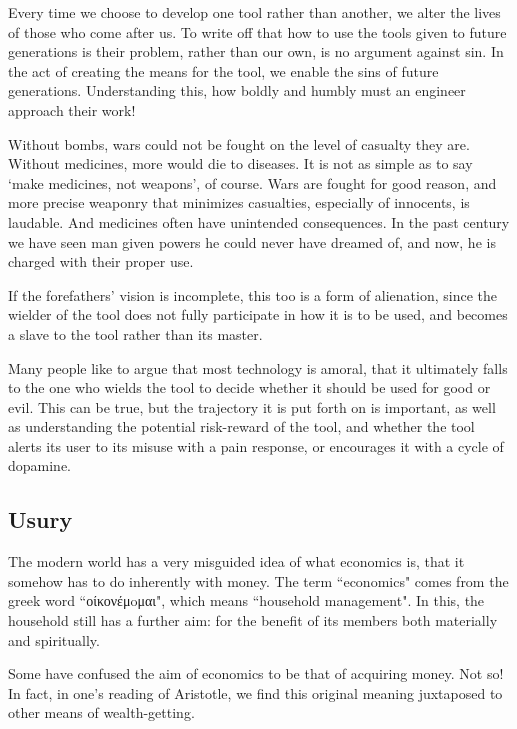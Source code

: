 \documentclass[letterpaper]{article}
\begin{document}
Every time we choose to develop one tool rather than another, we alter the lives of those who come after us. To write off that how to use the tools given to future generations is their problem, rather than our own, is no argument against sin. In the act of creating the means for the tool, we enable the sins of future generations. Understanding this, how boldly and humbly must an engineer approach their work!

Without bombs, wars could not be fought on the level of casualty they are. Without medicines, more would die to diseases. It is not as simple as to say `make medicines, not weapons', of course. Wars are fought for good reason, and more precise weaponry that minimizes casualties, especially of innocents, is laudable. And medicines often have unintended consequences. In the past century we have seen man given powers he could never have dreamed of, and now, he is charged with their proper use.

If the forefathers' vision is incomplete, this too is a form of alienation, since the wielder of the tool does not fully participate in how it is to be used, and becomes a slave to the tool rather than its master.

Many people like to argue that most technology is amoral, that it ultimately falls to the one who wields the tool to decide whether it should be used for good or evil. This can be true, but the trajectory it is put forth on is important, as well as understanding the potential risk-reward of the tool, and whether the tool alerts its user to its misuse with a pain response, or encourages it with a cycle of dopamine.

\subsection{Usury}

The modern world has a very misguided idea of what economics is, that it somehow has to do inherently with money. The term ``economics" comes from the greek word ``οίκονέμoμαι", which means ``household management". In this, the household still has a further aim: for the benefit of its members both materially and spiritually.

Some have confused the aim of economics to be that of acquiring money. Not so! In fact, in one's reading of Aristotle, we find this original meaning juxtaposed to other means of wealth-getting.
\end{document}
